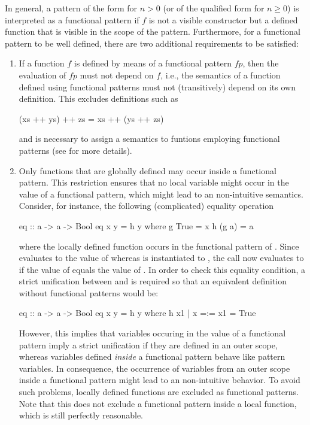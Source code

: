In general, a pattern of the form  for $n>0$
(or of the qualified form  for $n \geq 0$)
is interpreted as a functional pattern if $f$ is not a visible constructor
but a defined function that is visible in the scope of the pattern.
Furthermore, for a functional pattern to be well defined,
there are two additional requirements to be satisfied:

\begin{enumerate}

\item
If a function $f$ is defined by means of a functional pattern $fp$,
then the evaluation of $fp$ must not depend on $f$, i.e.,
the semantics of a function defined using functional patterns
must not (transitively) depend on its own definition.
This excludes definitions such as
\begin{curry}
(xs ++ ys) ++ zs = xs ++ (ys ++ zs)
\end{curry}
and is necessary to assign a semantics to funtions employing functional patterns
(see \cite{AntoyHanus05LOPSTR} for more details).

\item
Only functions that are globally defined may occur inside a functional pattern.
This restriction ensures that no local variable
might occur in the value of a functional pattern,
which might lead to an non-intuitive semantics.
Consider, for instance, the following (complicated) equality operation
\begin{curry}
eq :: a -> a -> Bool
eq x y = h y
 where
  g True  = x
  h (g a) = a
\end{curry}
where the locally defined function  occurs in the functional
pattern  of .
Since  evaluates to the value of  whereas 
is instantiated to , the call  now evaluates to 
if the value of  equals the value of .
In order to check this equality condition,
a strict unification between  and  is required
so that an equivalent definition without functional patterns would be:
\begin{curry}
eq :: a -> a -> Bool
eq x y = h y
 where
  h x1 | x =:= x1 = True
\end{curry}
However, this implies that variables occuring in the value
of a functional pattern imply a strict unification
if they are defined in an outer scope,
whereas variables defined \emph{inside} a functional pattern
behave like pattern variables.
In consequence, the occurrence of variables from an outer scope
inside a functional pattern might lead to an non-intuitive behavior.
To avoid such problems, locally defined functions are excluded
as functional patterns.
Note that this does not exclude a functional pattern inside a local function,
which is still perfectly reasonable.
\end{enumerate}
